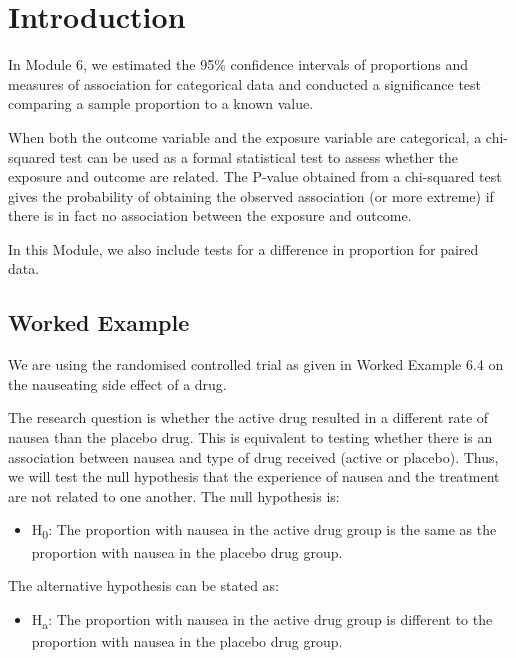 \documentclass[
]{memoir}
\providecommand{\tightlist}{%
  \setlength{\itemsep}{0pt}\setlength{\parskip}{0pt}}
\begin{document}
\hypertarget{introduction-6}{%
\section{Introduction}\label{introduction-6}}

In Module 6, we estimated the 95\% confidence intervals of proportions and measures of association for categorical data and conducted a significance test comparing a sample proportion to a known value.

When both the outcome variable and the exposure variable are categorical, a chi-squared test can be used as a formal statistical test to assess whether the exposure and outcome are related. The P-value obtained from a chi-squared test gives the probability of obtaining the observed association (or more extreme) if there is in fact no association between the exposure and outcome.

In this Module, we also include tests for a difference in proportion for paired data.

\hypertarget{worked-example-9}{%
\subsection{Worked Example}\label{worked-example-9}}

We are using the randomised controlled trial as given in Worked Example 6.4 on the nauseating side effect of a drug.

The research question is whether the active drug resulted in a different rate of nausea than the placebo drug. This is equivalent to testing whether there is an association between nausea and type of drug received (active or placebo). Thus, we will test the null hypothesis that the experience of nausea and the treatment are not related to one another. The null hypothesis is:

\begin{itemize}
\tightlist
\item
  H\textsubscript{0}: The proportion with nausea in the active drug group is the same as the proportion with nausea in the placebo drug group.
\end{itemize}

The alternative hypothesis can be stated as:

\begin{itemize}
\tightlist
\item
  H\textsubscript{a}: The proportion with nausea in the active drug group is different to the proportion with nausea in the placebo drug group.
\end{itemize}
\end{document}
